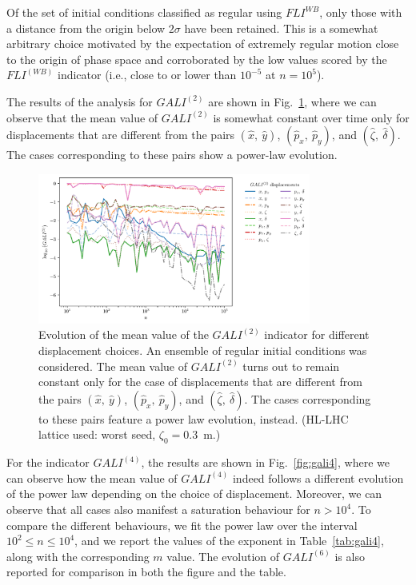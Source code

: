 Of the set of initial conditions classified as regular using $FLI^{WB}$, only those with a distance from the origin below $2\sigma$ have been retained. This is a somewhat arbitrary choice motivated by the expectation of extremely regular motion close to the origin of phase space and corroborated by the low values scored by the $FLI^{(WB)}$ indicator (i.e., close to or lower than $10^{-5}$ at $n=10^5$).

The results of the analysis for $GALI^{(2)}$ are shown in Fig.~\ref{fig:gali2}, where we can observe that the mean value of $GALI^{(2)}$ is somewhat constant over time only for displacements that are different from the pairs $(\hat{x},\ \hat{y})$, $(\hat{p}_x,\ \hat{p}_y)$, and $(\hat{\zeta},\ \hat{\delta})$. The cases corresponding to these pairs show a power-law evolution.

\begin{figure}
    \centering
    \includegraphics[width=0.8\textwidth]{6_lhc_dynamic_indicators/figs/evolution_gali_2_stable.pdf}
    \caption{Evolution of the mean value of the $GALI^{(2)}$ indicator for different displacement choices. An ensemble of regular initial conditions was considered. The mean value of $GALI^{(2)}$ turns out to remain constant only for the case of displacements that are different from the pairs $(\hat{x},\ \hat{y})$, $(\hat{p}_x,\ \hat{p}_y)$, and $(\hat{\zeta},\ \hat{\delta})$. The cases corresponding to these pairs feature a power law evolution, instead. (HL-LHC lattice used: worst seed, $\zeta_0=$\SI{0.3}{\meter}.)}
    \label{fig:gali2}
\end{figure}

For the indicator $GALI^{(4)}$, the results are shown in Fig.~\ref{fig:gali4}, where we can observe how the mean value of $GALI^{(4)}$ indeed follows a different evolution of the power law depending on the choice of displacement. Moreover, we can observe that all cases also manifest a saturation behaviour for $n>10^4$. To compare the different behaviours, we fit the power law over the interval $10^2\leq n \leq 10^4$, and we report the values of the exponent in Table~\ref{tab:gali4}, along with the corresponding $m$ value. The evolution of $GALI^{(6)}$ is also reported for comparison in both the figure and the table.

